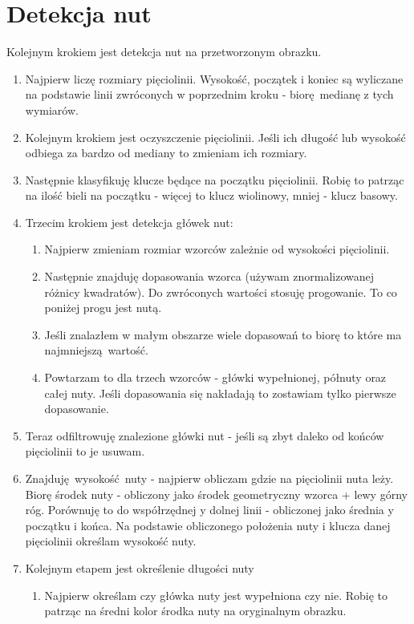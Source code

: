 \documentclass[12pt]{article}
\begin{document}
	\clearpage
	\section{Detekcja nut}
		Kolejnym krokiem jest detekcja nut na przetworzonym obrazku.
		\begin{enumerate}
			\item Najpierw liczę rozmiary pięciolinii. Wysokość, początek i koniec są wyliczane na podstawie linii zwróconych w poprzednim kroku - biorę medianę z tych wymiarów.
			\item Kolejnym krokiem jest oczyszczenie pięciolinii. Jeśli ich długość lub wysokość odbiega za bardzo od mediany to zmieniam ich rozmiary.
			\item Następnie klasyfikuję klucze będące na początku pięciolinii. Robię to patrząc na ilość bieli na początku - więcej to klucz wiolinowy, mniej - klucz basowy.
			\item Trzecim krokiem jest detekcja główek nut:
				\begin{enumerate}
					\item Najpierw zmieniam rozmiar wzorców zależnie od wysokości pięciolinii.
					\item Następnie znajduję dopasowania wzorca (używam znormalizowanej różnicy kwadratów). Do zwróconych wartości stosuję progowanie. To co poniżej progu jest nutą.
					\item Jeśli znalazłem w małym obszarze wiele dopasowań to biorę to które ma najmniejszą wartość.
					\item Powtarzam to dla trzech wzorców - główki wypełnionej, półnuty oraz całej nuty. Jeśli dopasowania się nakładają to zostawiam tylko pierwsze dopasowanie.
				\end{enumerate}
			\item Teraz odfiltrowuję znalezione główki nut - jeśli są zbyt daleko od końców pięciolinii to je usuwam.
			\item Znajduję wysokość nuty - najpierw obliczam gdzie na pięciolinii nuta leży. Biorę środek nuty - obliczony jako środek geometryczny wzorca + lewy górny róg. Porównuję to do współrzędnej y dolnej linii - obliczonej jako średnia y początku i końca. Na podstawie obliczonego położenia nuty i klucza danej pięciolinii określam wysokość nuty.
			\item Kolejnym etapem jest określenie długości nuty
				\begin{enumerate}
					\item Najpierw określam czy główka nuty jest wypełniona czy nie. Robię to patrząc na średni kolor środka nuty na oryginalnym obrazku.

\end{enumerate}
\end{enumerate}
\end{document}
